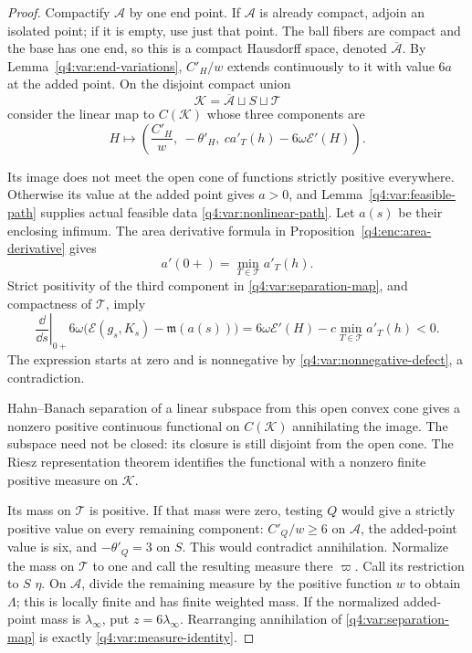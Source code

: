 \begin{proof}
Compactify $\mathcal A$ by one end point. If $\mathcal A$ is already
compact, adjoin an isolated point; if it is empty, use just that point.
The ball fibers are compact and the base has one end, so this is a compact
Hausdorff space, denoted $\overline{\mathcal A}$. By
Lemma~\ref{q4:var:end-variations}, $C'_H/w$ extends continuously to it with
value $6a$ at the added point. On the disjoint compact union
\[
 \mathcal K=\overline{\mathcal A}\sqcup S\sqcup\mathcal T
\]
consider the linear map to $C(\mathcal K)$ whose three components are
\begin{equation}
 H\longmapsto
 \left(\frac{C'_H}{w},\ -\theta'_H,\
                   c a'_T(h)-6\omega\mathcal E'(H)\right).
\label{q4:var:separation-map}
\end{equation}

Its image does not meet the open cone of functions strictly positive
everywhere. Otherwise its value at the added point gives $a>0$, and
Lemma~\ref{q4:var:feasible-path} supplies actual feasible data
\eqref{q4:var:nonlinear-path}. Let $a(s)$ be their enclosing infimum. The
area derivative formula in Proposition~\ref{q4:enc:area-derivative} gives
\[
 a'(0+)=\min_{T\in\mathcal T}a'_T(h).
\]
Strict positivity of the third component in \eqref{q4:var:separation-map},
and compactness of $\mathcal T$, imply
\[
 \left.\frac{\dd}{\dd s}\right|_{0+}
   6\omega\bigl(\mathcal E(g_s,K_s)-\mathfrak m(a(s))\bigr)
   =6\omega\mathcal E'(H)-c\min_{T\in\mathcal T}a'_T(h)<0.
\]
The expression starts at zero and is nonnegative by
\eqref{q4:var:nonnegative-defect}, a contradiction.

Hahn--Banach separation of a linear subspace from this open convex cone
gives a nonzero positive continuous functional on $C(\mathcal K)$
annihilating the image. The subspace need not be closed: its closure is
still disjoint from the open cone. The Riesz representation theorem
identifies the functional with a nonzero finite positive measure on
$\mathcal K$.

Its mass on $\mathcal T$ is positive. If that mass were zero, testing $Q$
would give a strictly positive value on every remaining component:
$C'_Q/w\ge6$ on $\mathcal A$, the added-point value is six, and
$-\theta'_Q=3$ on $S$. This would contradict annihilation. Normalize the
mass on $\mathcal T$ to one and call the resulting measure there
$\varpi$. Call its restriction to $S$ $\eta$. On $\mathcal A$, divide
the remaining measure by the positive function $w$ to obtain $\Lambda$;
this is locally finite and has finite weighted mass. If the normalized
added-point mass is $\lambda_\infty$, put $z=6\lambda_\infty$.
Rearranging annihilation of \eqref{q4:var:separation-map} is exactly
\eqref{q4:var:measure-identity}.
\end{proof}

